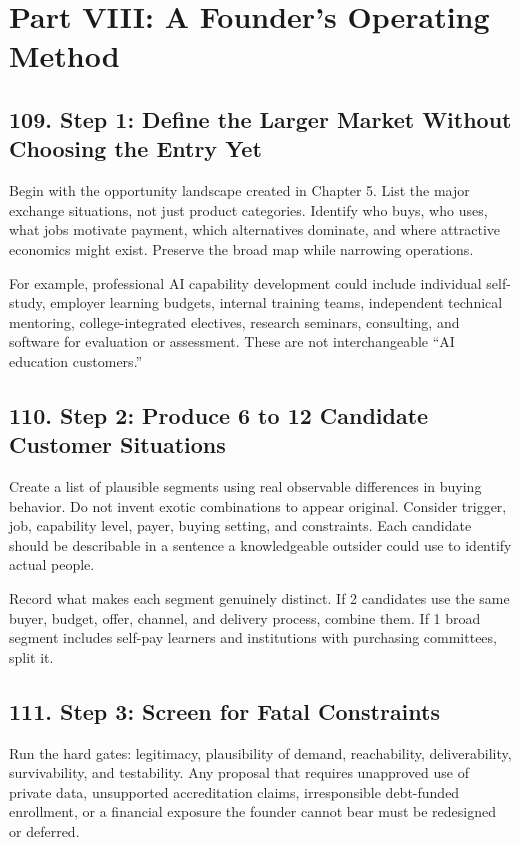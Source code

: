 \section*{Part VIII: A Founder's Operating Method}

\subsection*{109. Step 1: Define the Larger Market Without Choosing the Entry Yet}

Begin with the opportunity landscape created in Chapter 5. List the major exchange situations, not just product categories. Identify who buys, who uses, what jobs motivate payment, which alternatives dominate, and where attractive economics might exist. Preserve the broad map while narrowing operations.

For example, professional AI capability development could include individual self-study, employer learning budgets, internal training teams, independent technical mentoring, college-integrated electives, research seminars, consulting, and software for evaluation or assessment. These are not interchangeable ``AI education customers.''

\subsection*{110. Step 2: Produce 6 to 12 Candidate Customer Situations}

Create a list of plausible segments using real observable differences in buying behavior. Do not invent exotic combinations to appear original. Consider trigger, job, capability level, payer, buying setting, and constraints. Each candidate should be describable in a sentence a knowledgeable outsider could use to identify actual people.

Record what makes each segment genuinely distinct. If 2 candidates use the same buyer, budget, offer, channel, and delivery process, combine them. If 1 broad segment includes self-pay learners and institutions with purchasing committees, split it.

\subsection*{111. Step 3: Screen for Fatal Constraints}

Run the hard gates: legitimacy, plausibility of demand, reachability, deliverability, survivability, and testability. Any proposal that requires unapproved use of private data, unsupported accreditation claims, irresponsible debt-funded enrollment, or a financial exposure the founder cannot bear must be redesigned or deferred.

